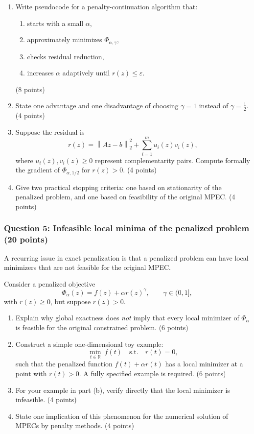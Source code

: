 \documentclass[pdflatex,sn-mathphys-num]{sn-jnl}%
\theoremstyle{definition}
\newcommand{\R}{\mathbb{R}}
\newcommand{\norm}[1]{\left\lVert #1 \right\rVert}
\begin{document}
\begin{enumerate}[label=(\alph*)]
    \item Write pseudocode for a penalty-continuation algorithm that:
    \begin{enumerate}[label=\roman*.]
        \item starts with a small \(\alpha\),
        \item approximately minimizes \(\Phi_{\alpha,\gamma}\),
        \item checks residual reduction,
        \item increases \(\alpha\) adaptively until \(r(z)\le \varepsilon\).
    \end{enumerate}
    (8 points)

    \item State one advantage and one disadvantage of choosing \(\gamma=1\) instead of \(\gamma=\tfrac12\). (4 points)

    \item Suppose the residual is
    \[
    r(z)=\norm{Az-b}_2^2+\sum_{i=1}^m u_i(z)v_i(z),
    \]
    where \(u_i(z),v_i(z)\ge 0\) represent complementarity pairs.
    Compute formally the gradient of \(\Phi_{\alpha,1/2}\) for \(r(z)>0\). (4 points)

    \item Give two practical stopping criteria: one based on stationarity of the penalized problem, and one based on feasibility of the original MPEC. (4 points)
\end{enumerate}

\subsubsection*{Question 5: Infeasible local minima of the penalized problem (20 points)}

A recurring issue in exact penalization is that a penalized problem can have local minimizers that are not feasible for the original MPEC.

Consider a penalized objective
\[
\Phi_\alpha(z)=f(z)+\alpha r(z)^\gamma,
\qquad \gamma\in(0,1],
\]
with \(r(z)\ge 0\), but suppose \(r(\bar z)>0\).

\begin{enumerate}[label=(\alph*)]
    \item Explain why global exactness does \emph{not} imply that every local minimizer of \(\Phi_\alpha\) is feasible for the original constrained problem. (6 points)

    \item Construct a simple one-dimensional toy example:
    \[
    \min_{t\in\R}\ f(t)
    \quad \text{s.t.}\quad r(t)=0,
    \]
    such that the penalized function \(f(t)+\alpha r(t)\) has a local minimizer at a point with \(r(t)>0\). A fully specified example is required. (6 points)

    \item For your example in part (b), verify directly that the local minimizer is infeasible. (4 points)

    \item State one implication of this phenomenon for the numerical solution of MPECs by penalty methods. (4 points)
\end{enumerate}
\end{document}
